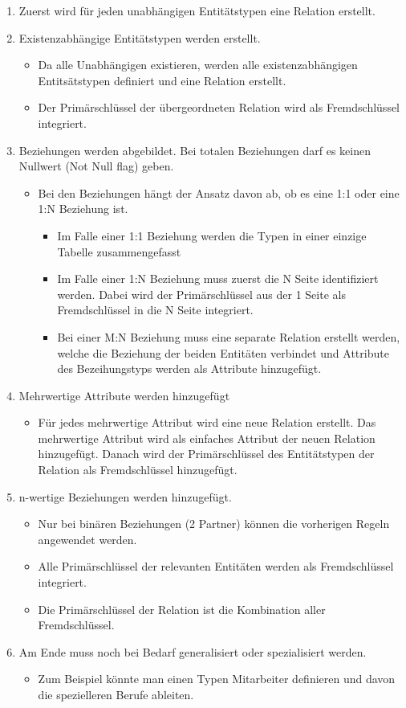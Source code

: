 \documentclass{article}
\begin{document}
 	\begin{enumerate}
 		\item{Zuerst wird für jeden unabhängigen Entitätstypen eine Relation erstellt.}
 		\item{Existenzabhängige Entitätstypen werden erstellt.}
 		\begin{itemize}
 			\item{Da alle Unabhängigen existieren, werden alle existenzabhängigen Entitsätstypen definiert und eine Relation erstellt.}
 			\item{Der Primärschlüssel der übergeordneten Relation wird als Fremdschlüssel integriert.}
 		\end{itemize}
 		\item{Beziehungen werden abgebildet. Bei totalen Beziehungen darf es keinen Nullwert (Not Null flag) geben.}
 		\begin{itemize}
 			\item{Bei den Beziehungen hängt der Ansatz davon ab, ob es eine 1:1 oder eine 1:N Beziehung ist.}
 			\begin{itemize}
 				\item{Im Falle einer 1:1 Beziehung werden die Typen in einer einzige Tabelle zusammengefasst}
 				\item{Im Falle einer 1:N Beziehung muss zuerst die N Seite identifiziert werden. Dabei wird der Primärschlüssel aus der 1 Seite als Fremdschlüssel in die N Seite integriert.}
 				\item{Bei einer M:N Beziehung muss eine separate Relation erstellt werden, welche die Beziehung der beiden Entitäten verbindet und Attribute des Bezeihungstyps werden als Attribute hinzugefügt.}
 			\end{itemize}
 		\end{itemize}
 		\item{Mehrwertige Attribute werden hinzugefügt}
 		\begin{itemize}
 			\item{Für jedes mehrwertige Attribut wird eine neue Relation erstellt. Das mehrwertige Attribut wird als einfaches Attribut der neuen Relation hinzugefügt. Danach wird der Primärschlüssel des Entitätstypen der Relation als Fremdschlüssel hinzugefügt.}
 		\end{itemize}
 		\item{n-wertige Beziehungen werden hinzugefügt.}
 		\begin{itemize}
 			\item{Nur bei binären Beziehungen (2 Partner) können die vorherigen Regeln angewendet werden.}
 			\item{Alle Primärschlüssel der relevanten Entitäten werden als Fremdschlüssel integriert.}
 			\item{Die Primärschlüssel der Relation ist die Kombination aller Fremdschlüssel.}
 		\end{itemize}
 		\item{Am Ende muss noch bei Bedarf generalisiert oder spezialisiert werden.}
 		\begin{itemize}
 			\item{Zum Beispiel könnte man einen Typen Mitarbeiter definieren und davon die spezielleren Berufe ableiten.}
 		\end{itemize}
 	\end{enumerate}
\end{document}
